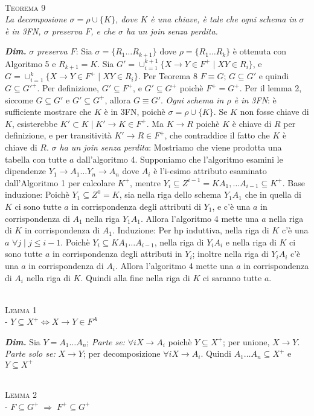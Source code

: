 \documentclass[a4paper,10pt]{article} %
\newcommand{\dimo}[1]{%
    \par \hfill\begin{minipage}{0.99\linewidth}{ \tiny {\textbf{\em{Dim.}}} {#1} }\end{minipage}}
\newcommand{\mtheorem}[1]{%
    {\hspace*{-10pt} \textsc {#1}}}
\begin{document}
    \\[1ex]
    \mtheorem {Teorema 9}\\
        \emph{La decomposione $\sigma = \rho \cup \{K\}$, dove $K$ è una chiave, è tale che ogni schema in $\sigma$ è in 3FN, $\sigma$ preserva $F$, e che $\sigma$ ha un join senza perdita.}
        \dimo{
            \emph{$\sigma$ preserva $F$}: Sia $\sigma = \{ R_1 \ldots R_{k+1} \}$ dove $\rho = \{ R_1 \ldots R_k \}$ è ottenuta con Algoritmo 5 e $R_{k+1} = K$. Sia $G' = \cup_{i=1}^{k+1} \{ X \rightarrow Y \in F^+ \; | \; XY \in R_i \}$, e $G = \cup_{i=1}^{k} \{ X \rightarrow Y \in F^+ \; | \; XY \in R_i \}$. Per Teorema 8 $F \equiv G$; $G \subseteq G'$ e quindi $G \subseteq G'^+$. Per definizione, $G' \subseteq F^+$, e $G' \subseteq G^+$ poichè $F^+ = G^+$. Per il lemma 2, siccome $G \subseteq G'$ e $G' \subseteq G^+$, allora $G \equiv G'$.
            \emph{Ogni schema in $\rho$ è in 3FN}: è sufficiente mostrare che $K$ è in 3FN, poichè $\sigma = \rho \cup \{ K \}$. Se $K$ non fosse chiave di $K$, esisterebbe $K' \subset K \; | \; K' \rightarrow K \in F^+$. Ma $K \rightarrow R$ poichè $K$ è chiave di $R$ per definizione, e per transitività $K' \rightarrow R \in F^+$, che contraddice il fatto che $K$ è chiave di $R$.
            \emph{$\sigma$ ha un join senza perdita}: Mostriamo che viene prodotta una tabella con tutte $a$ dall'algoritmo 4. Supponiamo che l'algoritmo esamini le dipendenze $Y_1 \rightarrow A_1 \ldots Y_n \rightarrow A_n$ dove $A_i$ è l'i-esimo attributo esaminato dall'Algoritmo 1 per calcolare $K^+$, mentre $Y_i \subseteq Z^{i-1} = KA_1, \ldots A_{i-1} \subseteq K^+$. Base induzione: Poichè $Y_1 \subseteq Z^0 = K$, sia nella riga dello schema $Y_1A_1$ che in quella di $K$ ci sono tutte $a$ in corrispondenza degli attributi di $Y_1$, e c'è una $a$ in corrispondenza di $A_1$ nella riga $Y_1A_1$. Allora l'algoritmo 4 mette una $a$ nella riga di $K$ in corrispondenza di $A_1$. Induzione: Per hp induttiva, nella riga di $K$ c'è una $a$ $\forall j \; | \; j \leq i - 1$. Poichè $Y_i \subseteq KA_1 \ldots A_{i-1}$, nella riga di $Y_iA_i$ e nella riga di $K$ ci sono tutte $a$ in corrispondenza degli attributi in $Y_i$; inoltre nella riga di $Y_iA_i$ c'è una $a$ in corrispondenza di $A_i$. Allora l'algoritmo 4 mette una $a$ in corrispondenza di $A_i$ nella riga di $K$. Quindi alla fine nella riga di $K$ ci saranno tutte $a$.
        }
    \\[1ex]
    \mtheorem {{Lemma 1}}\\
        - $Y \subseteq X^+ \Leftrightarrow X \rightarrow Y \in F^A$
        \dimo{Sia $Y = A_1 \ldots A_n$; \emph{Parte se:} $\forall i X \rightarrow A_i$ poichè $Y \subseteq X^+$; per unione, $X \rightarrow Y$. 
              \emph{Parte solo se:} $X \rightarrow Y$; per decomposizione $\forall i X \rightarrow A_i$. Quindi $A_1 \ldots A_n \subseteq X^+$ e $Y \subseteq X^+$}
    \\[1ex]
    \mtheorem {{Lemma 2}}\\
        - $F \subseteq G^+ \;\Rightarrow\; F^+ \subseteq G^+$
\end{document}

